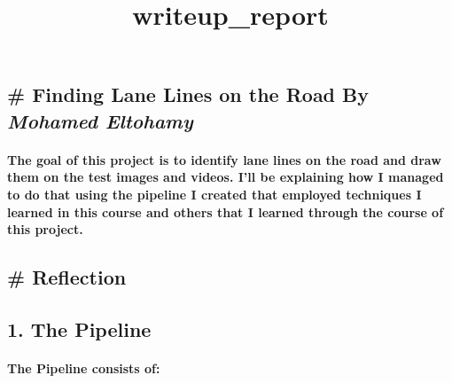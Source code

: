 \documentclass[11pt]{article}
\title{writeup\_report}
\begin{document}
    
    
    \maketitle
    
    

    
    \hypertarget{finding-lane-lines-on-the-road-by-mohamed-eltohamy}{%
\subsection{\texorpdfstring{\# Finding Lane Lines on the Road By
\emph{Mohamed
Eltohamy}}{\# Finding Lane Lines on the Road By Mohamed Eltohamy}}\label{finding-lane-lines-on-the-road-by-mohamed-eltohamy}}

    \hypertarget{the-goal-of-this-project-is-to-identify-lane-lines-on-the-road-and-draw-them-on-the-test-images-and-videos.-ill-be-explaining-how-i-managed-to-do-that-using-the-pipeline-i-created-that-employed-techniques-i-learned-in-this-course-and-others-that-i-learned-through-the-course-of-this-project.}{%
\paragraph{The goal of this project is to identify lane lines on the
road and draw them on the test images and videos. I'll be explaining how
I managed to do that using the pipeline I created that employed
techniques I learned in this course and others that I learned through
the course of this
project.}\label{the-goal-of-this-project-is-to-identify-lane-lines-on-the-road-and-draw-them-on-the-test-images-and-videos.-ill-be-explaining-how-i-managed-to-do-that-using-the-pipeline-i-created-that-employed-techniques-i-learned-in-this-course-and-others-that-i-learned-through-the-course-of-this-project.}}

    \hypertarget{reflection}{%
\subsection{\# Reflection}\label{reflection}}

\hypertarget{the-pipeline}{%
\subsection{1. The Pipeline}\label{the-pipeline}}

\hypertarget{the-pipeline-consists-of}{%
\paragraph{The Pipeline consists of:}\label{the-pipeline-consists-of}}
\end{document}
